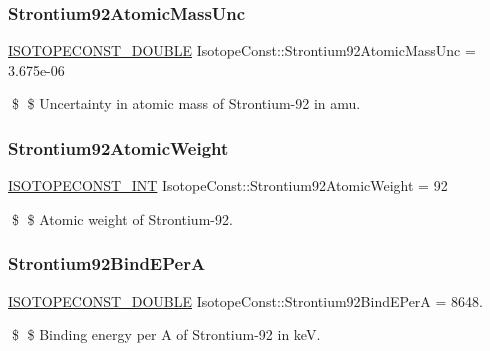 \subsubsection{\texorpdfstring{Strontium92\+Atomic\+Mass\+Unc}{Strontium92AtomicMassUnc}}
{\footnotesize\ttfamily \mbox{\hyperlink{group___isotope_const-_macros_ga8f45a7272ce02c0b4c65c44636ed719a}{I\+S\+O\+T\+O\+P\+E\+C\+O\+N\+S\+T\+\_\+\+D\+O\+U\+B\+LE}} Isotope\+Const\+::\+Strontium92\+Atomic\+Mass\+Unc = 3.\+675e-\/06}

\$ \$ Uncertainty in atomic mass of Strontium-\/92 in amu. \mbox{\label{group___isotope_const-_strontium-_sr92_ga2d76ab431e9a98eccf8a4836bd4135e6}} 
\subsubsection{\texorpdfstring{Strontium92\+Atomic\+Weight}{Strontium92AtomicWeight}}
{\footnotesize\ttfamily \mbox{\hyperlink{group___isotope_const-_macros_ga5f18360b3e99483a35c32d789e62621c}{I\+S\+O\+T\+O\+P\+E\+C\+O\+N\+S\+T\+\_\+\+I\+NT}} Isotope\+Const\+::\+Strontium92\+Atomic\+Weight = 92}

\$ \$ Atomic weight of Strontium-\/92. \mbox{\label{group___isotope_const-_strontium-_sr92_gaf5244e3f81426f11cab5be55189d0131}} 
\subsubsection{\texorpdfstring{Strontium92\+Bind\+E\+PerA}{Strontium92BindEPerA}}
{\footnotesize\ttfamily \mbox{\hyperlink{group___isotope_const-_macros_ga8f45a7272ce02c0b4c65c44636ed719a}{I\+S\+O\+T\+O\+P\+E\+C\+O\+N\+S\+T\+\_\+\+D\+O\+U\+B\+LE}} Isotope\+Const\+::\+Strontium92\+Bind\+E\+PerA = 8648.}

\$ \$ Binding energy per A of Strontium-\/92 in keV. \mbox{\label{group___isotope_const-_strontium-_sr92_ga8f6f90d2ca7009a0183935a088fbc555}} 
